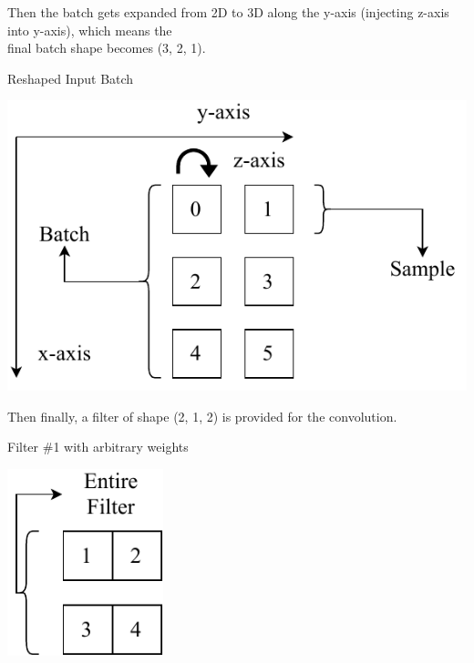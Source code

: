\documentclass[12pt]{article}
\newcommand\tab[1][1cm]{\hspace*{#1}}
\begin{document}
\begin{tcbraster}[raster columns=2,raster rows=1,
	enhanced,size=small,fit algorithm=hybrid* ]
	\begin{tcolorbox}[frame hidden,colback=white]
		\tab Then the batch gets expanded from \tab 2D to 3D along the y-axis (injecting z-\tab axis into y-axis), which means the\\\tab final batch shape becomes (3, 2, 1).
	\end{tcolorbox}
	\begin{inlinefigure}{Reshaped Input Batch}
		\begin{center}
			\includegraphics[width=\textwidth]{input_reshaped}
		\end{center}
	\end{inlinefigure}
\end{tcbraster}
\begin{tcbraster}[raster columns=2,raster rows=1,
	enhanced,size=small,fit algorithm=hybrid* ]
	\begin{tcolorbox}[frame hidden,colback=white]
		\tab Then finally, a filter of shape (2, 1, 2) is \tab provided for the convolution.
	\end{tcolorbox}
	\begin{inlinefigure}{Filter \#1 with arbitrary weights}
		\begin{center}
			\includegraphics[width=0.34\textwidth]{filter1}
		\end{center}
	\end{inlinefigure}
\end{tcbraster}
\end{document}
